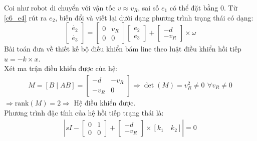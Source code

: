           \hspace*{0.6cm}Coi như robot di chuyển với vận tốc $v \approx v_R$, sai số $e_1$ có thể đặt bằng 0. Từ \ref{c6_e4} rút ra $e_2$, biến đổi và viết lại dưới dạng phương trình trạng thái có dạng:
          \begin{equation*}
               \begin{bmatrix}
                    \dot{e_2}\\
                    \dot{e_3}
               \end{bmatrix} = 
               \begin{bmatrix}
                    0 & v_R \\
                    0 & 0
               \end{bmatrix}
               \begin{bmatrix}
                    e_2\\
                    e_3
               \end{bmatrix} + \begin{bmatrix}
                    -d \\ 
                    -v_R 
               \end{bmatrix} \times \omega 
          \end{equation*}
          \hspace*{0.6cm}Bài toán đưa về thiết kế bộ điều khiển bám line theo luật điều khiển hồi tiếp $u = -k \times x$.\\
          \hspace*{0.6cm}Xét ma trận điều khiển được của hệ:
          \begin{align}
               M = [B \mid AB] = \begin{bmatrix}
               -d & -v_R \\
               -v_R & 0
          \end{bmatrix} \Rightarrow \det(M) = v_R^2 \neq 0 \,\ \forall v_R \neq 0
          \end{align}
          \hspace*{0.6cm}$\Rightarrow \text{rank}(M) = 2 \Rightarrow$ Hệ điều khiển được. \\
          \hspace*{0.6cm}Phương trình đặc tính của hệ hồi tiếp trạng thái là:
          \begin{align*}
               \left|sI - \begin{bmatrix} 0 & 1 \\ 0 & 0 \end{bmatrix} + \begin{bmatrix} -d \\ -v_R \end{bmatrix} \times [k_1 \quad k_2]\right| = 0
          \end{align*}
